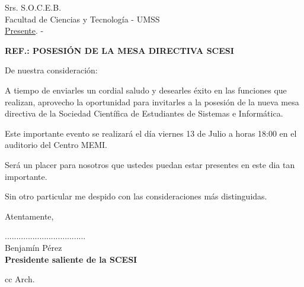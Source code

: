 \documentclass[letterpaper,12pt]{letter}
\begin{document}
\date {12 de julio de 2011}
\begin{letter}{Srs. S.O.C.E.B. \\ Facultad de Ciencias y Tecnolog\'ia - UMSS \\ \underline {Presente}. -}

\begin{center}
	\opening{\textbf{REF.: POSESI\'ON DE LA MESA DIRECTIVA SCESI}}
\end{center}

De nuestra consideración:

A tiempo de enviarles un cordial saludo y desearles éxito en las funciones que realizan, aprovecho la
oportunidad para invitarles a la posesi\'on de la nueva mesa directiva de la Sociedad Cient\'ifica 
de Estudiantes de Sistemas e Inform\'atica.

Este importante evento se realizar\'a el d\'ia viernes 13 de Julio a horas 18:00 en el auditorio del
Centro MEMI.

Ser\'a un placer para nosotros que ustedes puedan estar presentes en este dia tan importante.

Sin otro particular me despido con las consideraciones más distinguidas.

Atentamente,

\vspace{4cm}

\begin{center}
...................................\\
Benjam\'in P\'erez\\
{\bfseries Presidente saliente de la  SCESI}
\end{center}
\vspace{2cm}
cc Arch.
\end{letter}
\end{document}
